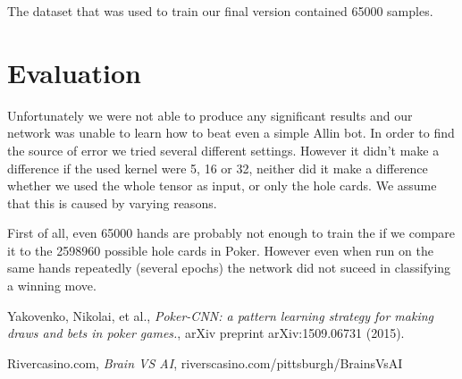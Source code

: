 \documentclass[]{report}
\begin{document}
The dataset that was used to train our final version contained 65000 samples. 

\section{Evaluation \label{see:evaluation} }

Unfortunately we were not able to produce any significant results and our network was unable to learn how to beat even a simple Allin bot. In order to find the source of error we tried several different settings. However it didn't make a difference if the used kernel were 5, 16 or 32, neither did it make a difference whether we used the whole tensor as input, or only the hole cards. We assume that this is caused by varying reasons. 

First of all, even 65000 hands are probably not enough to train the if we compare it to the 2598960 possible hole cards in Poker. However even when run on the same hands repeatedly (several epochs) the network did not suceed in classifying a winning move.

\begin{thebibliography}{}
	 Yakovenko, Nikolai, et al., \emph{Poker-CNN: a pattern learning strategy for making draws and bets in poker games.}, arXiv preprint arXiv:1509.06731 (2015).
	
	 Rivercasino.com, \emph{Brain VS AI},
	riverscasino.com/pittsburgh/BrainsVsAI

\end{thebibliography}  
\end{document}
